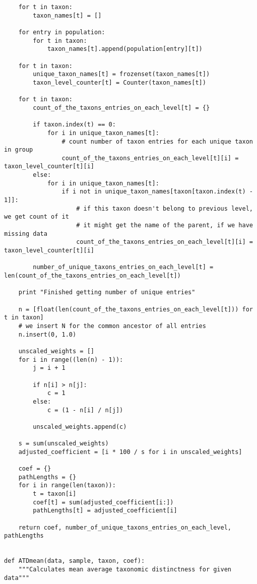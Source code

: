 \documentclass[a4paper,11pt]{article}
\begin{document}
\begin{lstlisting}
    for t in taxon:
        taxon_names[t] = []

    for entry in population:
        for t in taxon:
            taxon_names[t].append(population[entry][t])

    for t in taxon:
        unique_taxon_names[t] = frozenset(taxon_names[t])
        taxon_level_counter[t] = Counter(taxon_names[t])

    for t in taxon:
        count_of_the_taxons_entries_on_each_level[t] = {}

        if taxon.index(t) == 0:
            for i in unique_taxon_names[t]:
                # count number of taxon entries for each unique taxon in group
                count_of_the_taxons_entries_on_each_level[t][i] = taxon_level_counter[t][i]
        else:
            for i in unique_taxon_names[t]:
                if i not in unique_taxon_names[taxon[taxon.index(t) - 1]]:
                    # if this taxon doesn't belong to previous level, we get count of it
                    # it might get the name of the parent, if we have missing data
                    count_of_the_taxons_entries_on_each_level[t][i] = taxon_level_counter[t][i]

        number_of_unique_taxons_entries_on_each_level[t] = len(count_of_the_taxons_entries_on_each_level[t])

    print "Finished getting number of unique entries"

    n = [float(len(count_of_the_taxons_entries_on_each_level[t])) for t in taxon]
    # we insert N for the common ancestor of all entries
    n.insert(0, 1.0)

    unscaled_weights = []
    for i in range((len(n) - 1)):
        j = i + 1

        if n[i] > n[j]:
            c = 1
        else:
            c = (1 - n[i] / n[j])

        unscaled_weights.append(c)

    s = sum(unscaled_weights)
    adjusted_coefficient = [i * 100 / s for i in unscaled_weights]

    coef = {}
    pathLengths = {}
    for i in range(len(taxon)):
        t = taxon[i]
        coef[t] = sum(adjusted_coefficient[i:])
        pathLengths[t] = adjusted_coefficient[i]

    return coef, number_of_unique_taxons_entries_on_each_level, pathLengths


def ATDmean(data, sample, taxon, coef):
    """Calculates mean average taxonomic distinctness for given data"""


\end{lstlisting}
\end{document}
